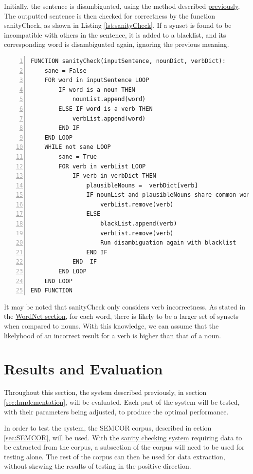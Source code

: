 \documentclass[]{article}
\begin{document}
Initially, the sentence is disambiguated, using the method described \hyperref[sec:ImplementedDisambiguation]{previously}. The outputted sentence is then checked for correctness by the function sanityCheck, as shown in Listing \ref{lst:sanityCheck}. If a synset is found to be incompatible with others in the sentence, it is added to a blacklist, and its corresponding word is disambiguated again, ignoring the previous meaning.

\begin{lstlisting}[numbers=left, numberstyle=\small, caption={The sanityCheck function}, captionpos=b, label={lst:sanityCheck}]
FUNCTION sanityCheck(inputSentence, nounDict, verbDict):
    sane = False
    FOR word in inputSentence LOOP
        IF word is a noun THEN
            nounList.append(word)
        ELSE IF word is a verb THEN
            verbList.append(word)
        END IF
    END LOOP
    WHILE not sane LOOP
        sane = True
        FOR verb in verbList LOOP
            IF verb in verbDict THEN
                plausibleNouns =  verbDict[verb]
                IF nounList and plausibleNouns share common words THEN
                    verbList.remove(verb)
                ELSE
                    blackList.append(verb)
                    verbList.remove(verb)
                    Run disambiguation again with blacklist
                END IF
            END  IF
		END LOOP
	END LOOP
END FUNCTION
\end{lstlisting}

It may be noted that sanityCheck only considers verb incorrectness. As stated in the \hyperref[Verbs]{WordNet section}, for each word, there is likely to be a larger set of synsets when compared to nouns. With this knowledge, we can assume that the likelyhood of an incorrect result for a verb is higher than that of a noun. 



\section{Results and Evaluation}
\label{sec:EvResults}
Throughout this section, the system described previously, in section \ref{sec:Implementation}, will be evaluated. Each part of the system will be tested, with their parameters being adjusted, to produce the optimal performance. 

In order to test the system, the SEMCOR corpus, described in ection \ref{sec:SEMCOR}, will be used. With the \hyperref[sec:Sanity]{sanity checking system} requiring data to be extracted from the corpus, a subsection of the corpus will need to be used for testing alone. The rest of the corpus can then be used for data extraction, without skewing the results of testing in the positive direction.
\end{document}
